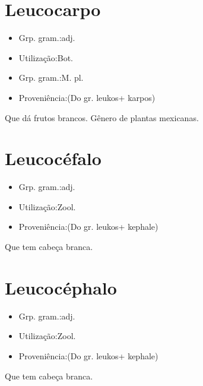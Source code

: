 \section{Leucocarpo}
\begin{itemize}
\item {Grp. gram.:adj.}
\end{itemize}
\begin{itemize}
\item {Utilização:Bot.}
\end{itemize}
\begin{itemize}
\item {Grp. gram.:M. pl.}
\end{itemize}
\begin{itemize}
\item {Proveniência:(Do gr. \textunderscore leukos\textunderscore  + \textunderscore karpos\textunderscore )}
\end{itemize}
Que dá frutos brancos.
Gênero de plantas mexicanas.
\section{Leucocéfalo}
\begin{itemize}
\item {Grp. gram.:adj.}
\end{itemize}
\begin{itemize}
\item {Utilização:Zool.}
\end{itemize}
\begin{itemize}
\item {Proveniência:(Do gr. \textunderscore leukos\textunderscore  + \textunderscore kephale\textunderscore )}
\end{itemize}
Que tem cabeça branca.
\section{Leucocéphalo}
\begin{itemize}
\item {Grp. gram.:adj.}
\end{itemize}
\begin{itemize}
\item {Utilização:Zool.}
\end{itemize}
\begin{itemize}
\item {Proveniência:(Do gr. \textunderscore leukos\textunderscore  + \textunderscore kephale\textunderscore )}
\end{itemize}
Que tem cabeça branca.
